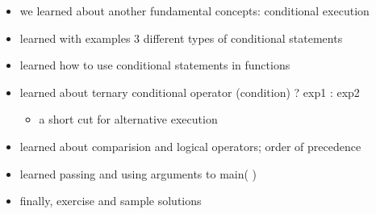 \documentclass[11pt]{article}
\makeatletter
\providecommand{\tightlist}{%
      \setlength{\itemsep}{0pt}\setlength{\parskip}{0pt}}
\newcommand{\boxspacing}{\kern\kvtcb@left@rule\kern\kvtcb@boxsep}
\newcommand{\prompt}[4]{
        {\ttfamily\llap{{\color{#2}[#3]:\hspace{3pt}#4}}\vspace{-\baselineskip}}
    }
\makeatother
\begin{document}
\begin{itemize}
\tightlist
\item
  we learned about another fundamental concepts: conditional execution
\item
  learned with examples 3 different types of conditional statements
\item
  learned how to use conditional statements in functions
\item
  learned about ternary conditional operator (condition) ? exp1 : exp2

  \begin{itemize}
  \tightlist
  \item
    a short cut for alternative execution
  \end{itemize}
\item
  learned about comparision and logical operators; order of precedence
\item
  learned passing and using arguments to main( )
\item
  finally, exercise and sample solutions
\end{itemize}

    \begin{tcolorbox}[breakable, size=fbox, boxrule=1pt, pad at break*=1mm,colback=cellbackground, colframe=cellborder]
\prompt{In}{incolor}{ }{\boxspacing}
\begin{Verbatim}[commandchars=\\\{\}]

\end{Verbatim}
\end{tcolorbox}


    
    
    
\end{document}
